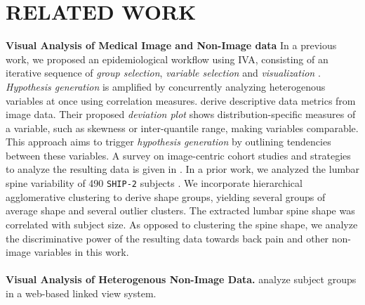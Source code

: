 \documentclass[a4paper,twoside]{style/article}
\begin{document}
\section{\uppercase{Related Work}}
\label{sec:RelatedWork}
\noindent \textbf{Visual Analysis of Medical Image and Non-Image data}
In a previous work, we proposed an epidemiological workflow using IVA, consisting of an iterative sequence of \emph{group selection}, \emph{variable selection} and \emph{visualization} \cite{Klemm2014VIS}.
\emph{Hypothesis generation} is amplified by concurrently analyzing heterogenous variables at once using correlation measures.
\cite{Turkay} derive descriptive data metrics from image data.
Their proposed \emph{deviation plot} shows distribution-specific measures of a variable, such as skewness or inter-quantile range, making variables comparable.
This approach aims to trigger \emph{hypothesis generation} by outlining tendencies between these variables.
A survey on image-centric cohort studies and strategies to analyze the resulting data is given in \cite{Preim2015}.
In a prior work, we analyzed the lumbar spine variability of 490 \texttt{SHIP-2} subjects \cite{Klemm2013VMV}.
We incorporate hierarchical agglomerative clustering to derive shape groups, yielding several groups of average shape and several outlier clusters.
The extracted lumbar spine shape was correlated with subject size.
As opposed to clustering the spine shape, we analyze the discriminative power of the resulting data towards back pain and other non-image variables in this work.
\\\\
\noindent \textbf{Visual Analysis of Heterogenous Non-Image Data.}
\cite{Zhang} analyze subject groups in a web-based linked view system.
\end{document}
